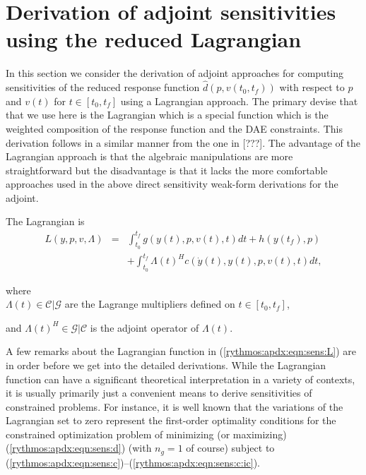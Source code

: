 \section{Derivation of adjoint sensitivities using the reduced Lagrangian}

In this section we consider the derivation of adjoint approaches for computing
sensitivities of the reduced response function $\hat{d}(p,v(t_0,t_f))$ with
respect to $p$ and $v(t)$ for $t\in[t_0,t_f]$ using a Lagrangian approach.  The
primary devise that that we use here is the Lagrangian which is a special
function which is the weighted composition of the response function and the
DAE constraints.  This derivation follows in a similar manner from the one in
[???].  The advantage of the Lagrangian approach is that the algebraic
manipulations are more straightforward but the disadvantage is that it lacks
the more comfortable approaches used in the above direct sensitivity weak-form
derivations for the adjoint.

The Lagrangian is
%
\begin{eqnarray}
L(y,p,v,\Lambda)
& = & \int_{t_0}^{t_f} g(y(t),p,v(t),t) dt + h(y(t_f),p) \nonumber \\
& & + \int_{t_0}^{t_f} \Lambda(t)^H c(\dot{y}(t),y(t),p,v(t),t) dt,
\label{rythmos:apdx:eqn:sens:L}
\end{eqnarray}
\begin{tabbing}
\hspace{4ex}where\hspace{1ex}\= \\
\>	$\Lambda(t) \in \mathcal{C}|\mathcal{G}$ are the Lagrange multipliers defined on $t\in[t_0,t_f]$,
\end{tabbing}
%
and $\Lambda(t)^H\in\mathcal{G}|\mathcal{C}$ is the adjoint operator
of $\Lambda(t)$.

A few remarks about the Lagrangian function in (\ref{rythmos:apdx:eqn:sens:L})
are in order before we get into the detailed derivations.  While the
Lagrangian function can have a significant theoretical interpretation in a
variety of contexts, it is usually primarily just a convenient means to derive
sensitivities of constrained problems.  For instance, it is well known that
the variations of the Lagrangian set to zero represent the first-order
optimality conditions for the constrained optimization problem of minimizing
(or maximizing) (\ref{rythmos:apdx:eqn:sens:d}) (with $n_g=1$ of course)
subject to
(\ref{rythmos:apdx:eqn:sens:c})--(\ref{rythmos:apdx:eqn:sens:c:ic}).


